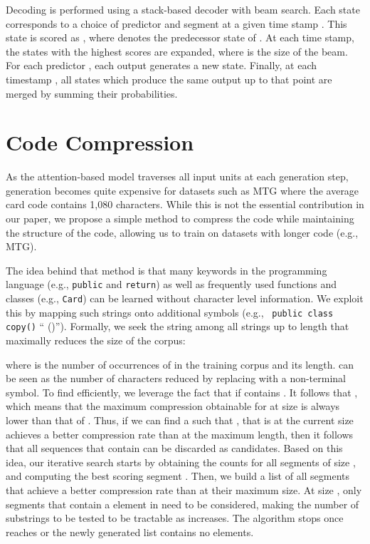\documentclass[11pt]{article}
\begin{document}
Decoding is performed using a stack-based decoder with beam search. Each state
 corresponds to a choice of predictor  and segment  at a given
time stamp . This state is scored as , where  denotes the
predecessor state of . At each time stamp, the  states with the highest
scores  are expanded, where  is the size of the beam. For each predictor
, each output  generates a new state. Finally, at each time\-stamp
, all states which produce the same output up to that point are merged by
summing their probabilities.

\section{Code Compression}
\label{sec:compression}


As the attention-based model traverses all input units at each generation step,
generation becomes quite expensive for datasets such as MTG where the average
card code contains 1,080 characters. While this is not the essential contribution in our paper, we propose a simple method to compress the code while maintaining the structure of the code, allowing us to train on datasets with longer code (e.g., MTG).

The idea behind that method is that many keywords in the
programming language (e.g., \texttt{public} and \texttt{return}) as well as frequently
used functions and classes (e.g., \texttt{Card}) can be learned without
character level information. We exploit this by mapping such strings onto
additional symbols  (e.g., ~\texttt{public class copy()}  ``
 ()''). Formally, we seek the string  among all
strings  up to length  that maximally reduces the size of the
corpus:

where  is the number of occurrences of  in the training corpus and
 its length.  can be seen as the number of characters
reduced by replacing  with a non-terminal symbol. To find  efficiently,
we leverage the fact that  if  contains . It follows that
, which means that the maximum compression
obtainable for  at size  is always lower than that of . Thus, if we
can find a  such that , that is
 at the current size achieves a better compression rate than  at
the maximum length, then it follows that all sequences that contain  can be
discarded as candidates. Based on this idea, our iterative search starts by
obtaining the counts  for all segments of size , and computing the
best scoring segment . Then, we build a list  of all segments
that achieve a better compression rate than  at their maximum size. At
size , only segments that contain a element in  need to be
considered, making the number of substrings to be tested to be tractable as 
increases. The algorithm stops once  reaches  or the newly generated
list  contains no elements.
\end{document}
